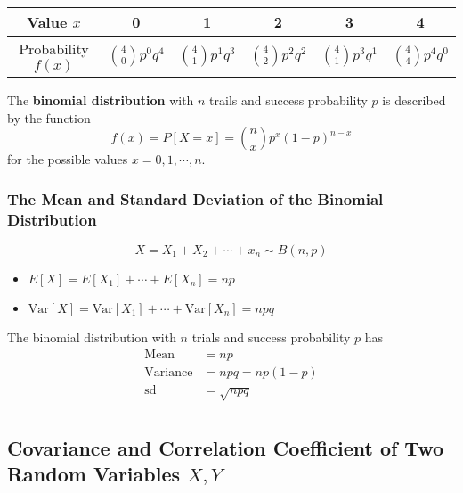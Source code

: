 \documentclass[12pt,openany]{book}
\theoremstyle{definition}
\newcommand{\Var}{\text{Var}}
\begin{document}
	\begin{center}\begin{tabular}{c||ccccc}
			\toprule[1.2pt]
			Value $x$ & 0 & 1 & 2 & 3 & 4 \\
			\hline
			Probability $f(x)$ & $\binom{4}{0}p^0q^4$ & $\binom{4}{1}p^1q^3$ & $\binom{4}{2}p^2q^2$ & $\binom{4}{1}p^3q^1$ & $\binom{4}{4}p^4q^0$ \\
			\bottomrule[1.2pt]
		\end{tabular}
	\end{center}
	
	\begin{tcolorbox}[colback=white]
		The \textbf{binomial distribution} with $n$ trails and success probability $p$ is described by the function \[
		f(x) = P[X=x] = \binom{n}{x}p^x(1-p)^{n-x}
		\] for the possible values $x = 0, 1, \cdots, n$.
	\end{tcolorbox}
	
	\subsubsection{The Mean and Standard Deviation of the Binomial Distribution}
	\[
	X=X_1+X_2+\cdots+x_n\sim B(n,p)
	\] \begin{itemize}
		\item \(E[X]=E[X_1] + \cdots + E[X_n] = np \)
		\item \(\Var[X]=\Var[X_1] + \cdots + \Var[X_n] = npq \)
	\end{itemize}
	
	\begin{tcolorbox}[colback=white]
		The binomial distribution with $n$ trials and success probability $p$ has \begin{align*}
			\text{Mean} &= np \\
			\text{Variance} &= npq = np(1-p) \\
			\text{sd} &= \sqrt{npq} \\
		\end{align*}
	\end{tcolorbox}
	
	\subsection{Covariance and Correlation Coefficient of Two Random Variables $X, Y$}
	
\end{document}

